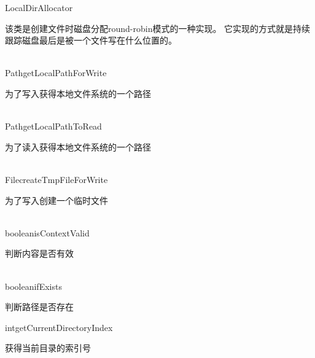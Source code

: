 \begin{XeClass}{LocalDirAllocator}
   
 该类是创建文件时磁盘分配round-robin模式的一种实现。
 它实现的方式就是持续跟踪磁盘最后是被一个文件写在什么位置的。

  \begin{XeMethod}{\XePublic\\ }{Path}{getLocalPathForWrite}
       
 为了写入获得本地文件系统的一个路径

  \end{XeMethod}

  \begin{XeMethod}{\XePublic\\ }{Path}{getLocalPathToRead}
       
 为了读入获得本地文件系统的一个路径

  \end{XeMethod}

  \begin{XeMethod}{\XePublic\\ }{File}{createTmpFileForWrite}
       
 为了写入创建一个临时文件

  \end{XeMethod}

  \begin{XeMethod}{\XePublic\\ }{boolean}{isContextValid}
       
 判断内容是否有效

  \end{XeMethod}

  \begin{XeMethod}{\XePublic\\ }{boolean}{ifExists}
       
 判断路径是否存在

  \end{XeMethod}

  \begin{XeMethod}{}{int}{getCurrentDirectoryIndex}
       
 获得当前目录的索引号

  \end{XeMethod}

\end{XeClass}

